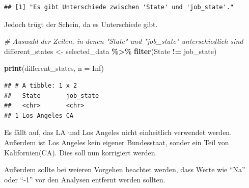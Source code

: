 \documentclass[
]{article}
\newenvironment{Shaded}{\begin{snugshade}}{\end{snugshade}}
\newcommand{\AttributeTok}[1]{\textcolor[rgb]{0.13,0.29,0.53}{#1}}
\newcommand{\CommentTok}[1]{\textcolor[rgb]{0.56,0.35,0.01}{\textit{#1}}}
\newcommand{\ConstantTok}[1]{\textcolor[rgb]{0.56,0.35,0.01}{#1}}
\newcommand{\ControlFlowTok}[1]{\textcolor[rgb]{0.13,0.29,0.53}{\textbf{#1}}}
\newcommand{\FunctionTok}[1]{\textcolor[rgb]{0.13,0.29,0.53}{\textbf{#1}}}
\newcommand{\NormalTok}[1]{#1}
\newcommand{\OtherTok}[1]{\textcolor[rgb]{0.56,0.35,0.01}{#1}}
\newcommand{\SpecialCharTok}[1]{\textcolor[rgb]{0.81,0.36,0.00}{\textbf{#1}}}
\newcommand{\StringTok}[1]{\textcolor[rgb]{0.31,0.60,0.02}{#1}}
\begin{document}
\begin{Shaded}
\end{Shaded}

\begin{verbatim}
## [1] "Es gibt Unterschiede zwischen 'State' und 'job_state'."
\end{verbatim}

Jedoch trügt der Schein, da es Unterschiede gibt.

\begin{Shaded}
\begin{Highlighting}[]
\CommentTok{\# Auswahl der Zeilen, in denen "State" und "job\_state" unterschiedlich sind}
\NormalTok{different\_states }\OtherTok{\textless{}{-}}\NormalTok{ selected\_data }\SpecialCharTok{\%\textgreater{}\%}
  \FunctionTok{filter}\NormalTok{(State }\SpecialCharTok{!=}\NormalTok{ job\_state)}

\FunctionTok{print}\NormalTok{(different\_states, }\AttributeTok{n =} \ConstantTok{Inf}\NormalTok{)}
\end{Highlighting}
\end{Shaded}

\begin{verbatim}
## # A tibble: 1 x 2
##   State       job_state
##   <chr>       <chr>    
## 1 Los Angeles CA
\end{verbatim}

Es fällt auf, das LA und Los Angeles nicht einheitlich verwendet werden.
Außerdem ist Los Angeles kein eigener Bundesstaat, sonder ein Teil von
Kalifornien(CA). Dies soll nun korrigiert werden.

Außerdem sollte bei weieren Vorgehen beachtet werden, dass Werte wie
``Na'' oder ``-1'' vor den Analysen entfernt werden sollten.
\end{document}
